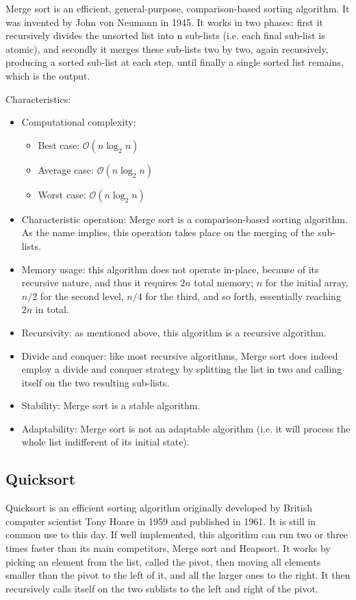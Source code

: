 \documentclass[12pt, a4paper]{article}
\begin{document}
Merge sort is an efficient, general-purpose, comparison-based sorting algorithm. It was invented by John von Neumann in 1945. It works in two phases: first it recursively divides the unsorted list into n sub-lists (i.e. each final sub-list is atomic), and secondly it merges these sub-lists two by two, again recursively, producing a sorted sub-list at each step, until finally a single sorted list remains, which is the output.

Characteristics:
\begin{itemize}
\item Computational complexity:
\begin{itemize}
\item Best case: $\mathcal{O}(n \log_2 n)$
\item Average case: $\mathcal{O}(n \log_2 n)$
\item Worst case: $\mathcal{O}(n \log_2 n)$
\end{itemize}
\item Characteristic operation: Merge sort is a comparison-based sorting algorithm. As the name implies, this operation takes place on the merging of the sub-lists.
\item Memory usage: this algorithm does not operate in-place, because of its recursive nature, and thus it requires $2n$ total memory; $n$ for the initial array, $n/2$ for the second level, $n/4$ for the third, and so forth, essentially reaching $2n$ in total.
\item Recursivity: as mentioned above, this algorithm is a recursive algorithm.
\item Divide and conquer: like most recursive algorithms, Merge sort does indeed employ a divide and conquer strategy by splitting the list in two and calling itself on the two resulting sub-lists.
\item Stability: Merge sort is a stable algorithm.
\item Adaptability: Merge sort is not an adaptable algorithm (i.e. it will process the whole list indifferent of its initial state).
\end{itemize}
\newpage

\subsection{Quicksort}

Quicksort is an efficient sorting algorithm originally developed by British computer scientist Tony Hoare in 1959 and published in 1961. It is still in common use to this day. If well implemented, this algorithm can run two or three times faster than its main competitors, Merge sort and Heapsort. It works by picking an element from the list, called the pivot, then moving all elements smaller than the pivot to the left of it, and all the larger ones to the right. It then recursively calls itself on the two sublists to the left and right of the pivot.
\end{document}
